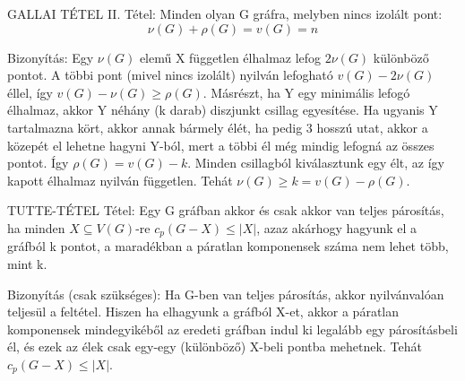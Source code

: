 \documentclass[]{article}
\begin{document}
\begin{framed}
GALLAI TÉTEL II. Tétel: Minden olyan G gráfra, melyben nincs izolált pont:
$$\nu(G) + \rho(G) = v(G) = n$$
\end{framed}
\begin{leftbar}
Bizonyítás: Egy $\nu(G)$ elemű X független élhalmaz lefog $2\nu(G)$ különböző pontot. A többi pont (mivel nincs izolált) nyilván lefogható $v(G) - 2\nu(G)$ éllel, így $v(G) - \nu(G) \geq \rho(G)$. Másrészt, ha Y egy minimális lefogó élhalmaz, akkor Y néhány (k darab) diszjunkt csillag egyesítése. Ha ugyanis Y tartalmazna kört, akkor annak bármely élét, ha pedig 3 hosszú utat, akkor a közepét el lehetne hagyni Y-ból, mert a többi él még mindig lefogná az összes pontot. Így $\rho(G) = v(G) - k$. Minden csillagból kiválasztunk egy élt, az így kapott élhalmaz nyilván független. Tehát $\nu(G) \geq k = v(G) - \rho(G)$.
\end{leftbar}
\begin{framed}
TUTTE-TÉTEL Tétel: Egy G gráfban akkor és csak akkor van teljes párosítás, ha minden $X \subseteq V(G)$-re $c_p(G - X)\leq |X|$, azaz akárhogy hagyunk el a gráfból k pontot, a maradékban a páratlan komponensek száma nem lehet több, mint k.
\end{framed}
\begin{leftbar}
Bizonyítás (csak szükséges): Ha G-ben van teljes párosítás, akkor nyilvánvalóan teljesül a feltétel. Hiszen ha elhagyunk a gráfból X-et, akkor a páratlan komponensek mindegyikéből az eredeti gráfban indul ki legalább egy párosításbeli él, és ezek az élek csak egy-egy (különböző) X-beli pontba mehetnek. Tehát $c_p(G - X) \leq |X|$.
\end{leftbar}
\end{document}
